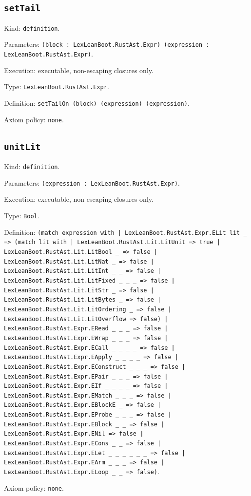 \documentclass[11pt]{article}
\begin{document}
\subsection*{\texttt{setTail}}
\noindent Kind: \texttt{definition}.\par
\noindent Parameters: \texttt{(block : LexLeanBoot.RustAst.Expr) (expression : LexLeanBoot.RustAst.Expr)}.\par
\noindent Execution: executable, non-escaping closures only.\par
\noindent Type: \texttt{LexLeanBoot.RustAst.Expr}.\par
\noindent Definition: \texttt{setTailOn (block) (expression) (expression)}.\par
\noindent Axiom policy: \texttt{none}.\par
\subsection*{\texttt{unitLit}}
\noindent Kind: \texttt{definition}.\par
\noindent Parameters: \texttt{(expression : LexLeanBoot.RustAst.Expr)}.\par
\noindent Execution: executable, non-escaping closures only.\par
\noindent Type: \texttt{Bool}.\par
\noindent Definition: \texttt{(match expression with | LexLeanBoot.RustAst.Expr.ELit lit \_ => (match lit with | LexLeanBoot.RustAst.Lit.LitUnit => true | LexLeanBoot.RustAst.Lit.LitBool \_ => false | LexLeanBoot.RustAst.Lit.LitNat \_ => false | LexLeanBoot.RustAst.Lit.LitInt \_ \_ => false | LexLeanBoot.RustAst.Lit.LitFixed \_ \_ \_ => false | LexLeanBoot.RustAst.Lit.LitStr \_ => false | LexLeanBoot.RustAst.Lit.LitBytes \_ => false | LexLeanBoot.RustAst.Lit.LitOrdering \_ => false | LexLeanBoot.RustAst.Lit.LitOverflow => false) | LexLeanBoot.RustAst.Expr.ERead \_ \_ \_ => false | LexLeanBoot.RustAst.Expr.EWrap \_ \_ \_ => false | LexLeanBoot.RustAst.Expr.ECall \_ \_ \_ \_ => false | LexLeanBoot.RustAst.Expr.EApply \_ \_ \_ \_ => false | LexLeanBoot.RustAst.Expr.EConstruct \_ \_ \_ => false | LexLeanBoot.RustAst.Expr.EPair \_ \_ \_ => false | LexLeanBoot.RustAst.Expr.EIf \_ \_ \_ \_ => false | LexLeanBoot.RustAst.Expr.EMatch \_ \_ \_ => false | LexLeanBoot.RustAst.Expr.EBlockE \_ => false | LexLeanBoot.RustAst.Expr.EProbe \_ \_ \_ => false | LexLeanBoot.RustAst.Expr.EBlock \_ \_ => false | LexLeanBoot.RustAst.Expr.ENil => false | LexLeanBoot.RustAst.Expr.ECons \_ \_ => false | LexLeanBoot.RustAst.Expr.ELet \_ \_ \_ \_ \_ \_ => false | LexLeanBoot.RustAst.Expr.EArm \_ \_ \_ => false | LexLeanBoot.RustAst.Expr.ELoop \_ \_ => false)}.\par
\noindent Axiom policy: \texttt{none}.\par
\end{document}
